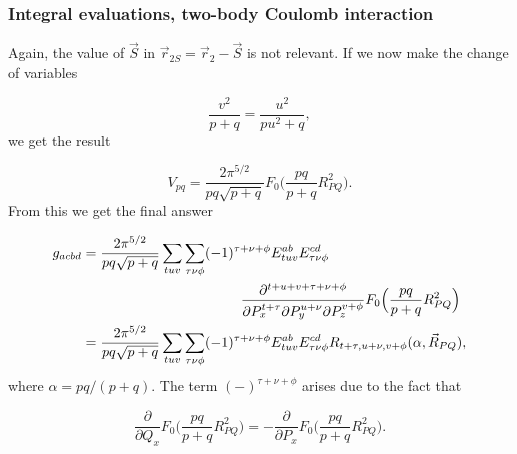 \documentclass{beamer}
\begin{document}
\begin{frame}
\frametitle{Integral evaluations, two-body Coulomb interaction}

\begin{block}{}

Again, the value of $\vec S$ in $\vec r_{2S} = \vec r_2 - \vec S$ is not relevant. If we now make the change of variables

\begin{equation}
 \frac{v^2}{p+q} = \frac{u^2}{pu^2+q},
\end{equation}
we get the result

\begin{equation}
 V_{pq} = \frac{2\pi^{5/2}}{pq\sqrt{p+q}}F_0\Big(\frac{pq}{p+q}R^2_{PQ}\Big).
\end{equation}
From this we get the final answer

\begin{equation}
\begin{split}
 g_{acbd} & = \frac{2\pi^{5/2}}{pq\sqrt{p+q}}\sum_{tuv}\sum_{\tau\nu\phi}(-1)^{\tau+\nu+\phi}E^{ab}_{tuv}E^{cd}_{\tau\nu\phi} \\
          & \hspace{40mm} \frac{\partial^{t+u+v+\tau+\nu+\phi}}{\partial P_x^{t+\tau} \partial P_y^{u+\nu} \partial P_z^{v+\phi}}F_0\Big(\frac{pq}{p+q}R^2_{PQ}\Big) \\
          & = \frac{2\pi^{5/2}}{pq\sqrt{p+q}}\sum_{tuv}\sum_{\tau\nu\phi}(-1)^{\tau+\nu+\phi}E^{ab}_{tuv}E^{cd}_{\tau\nu\phi}R_{t+\tau,u+\nu,v+\phi}(\alpha,\vec R_{PQ}),
\end{split}
\end{equation}
where $\alpha = pq/(p+q)$. The term $(-)^{\tau+\nu+\phi}$ arises due to the fact that

\begin{equation}
\frac{\partial}{\partial Q_x} F_0\Big(\frac{pq}{p+q}R^2_{PQ}\Big) = - \frac{\partial}{\partial P_x} F_0\Big(\frac{pq}{p+q}R^2_{PQ}\Big).
\end{equation}
\end{block}
\end{frame}
\end{document}
